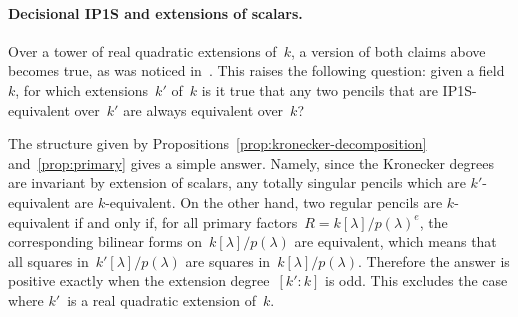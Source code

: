 \documentclass{lms}
\begin{document}
% 

\paragraph{Decisional IP1S and extensions of scalars.}

Over a tower of real quadratic extensions of~$k$,
a version of both claims above becomes true,
as was noticed in~\cite[6.1]{2013bfp}.
This raises the following question: given a field~$k$,
for which extensions~$k'$ of~$k$ is it true that
any two pencils that are IP1S-equivalent over~$k'$
are always equivalent over~$k$?

The structure given by Propositions~\ref{prop:kronecker-decomposition}
and~\ref{prop:primary} gives a simple answer.
Namely, since the Kronecker degrees are invariant by extension of scalars,
any totally singular pencils which are $k'$-equivalent are $k$-equivalent.
On the other hand, two regular pencils are $k$-equivalent
if and only if, for all primary factors~$R =k[λ]/p(λ)^e$,
the corresponding bilinear forms on~$k[λ]/p(λ)$ are equivalent,
which means that all squares in~$k'[λ]/p(λ)$
are squares in~$k[λ]/p(λ)$.
Therefore the answer is positive exactly when
the extension degree~$[k':k]$ is odd.
This excludes the case where $k'$~is a
real quadratic extension of~$k$.

\end{document}
